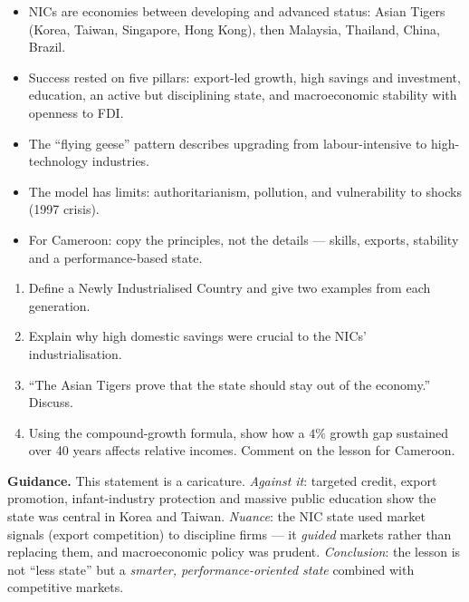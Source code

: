 \documentclass[11pt]{article}
\begin{document}
\begin{aretenir}
\begin{itemize}
\item NICs are economies between developing and advanced status: Asian Tigers (Korea, Taiwan, Singapore, Hong Kong), then Malaysia, Thailand, China, Brazil.
\item Success rested on five pillars: export-led growth, high savings and investment, education, an active but disciplining state, and macroeconomic stability with openness to FDI.
\item The ``flying geese'' pattern describes upgrading from labour-intensive to high-technology industries.
\item The model has limits: authoritarianism, pollution, and vulnerability to shocks (1997 crisis).
\item For Cameroon: copy the principles, not the details — skills, exports, stability and a performance-based state.
\end{itemize}
\end{aretenir}

\begin{exercice}[Practice]
\begin{enumerate}
\item Define a Newly Industrialised Country and give two examples from each generation.
\item Explain why high domestic savings were crucial to the NICs' industrialisation.
\item ``The Asian Tigers prove that the state should stay out of the economy.'' Discuss.
\item Using the compound-growth formula, show how a $4\%$ growth gap sustained over 40 years affects relative incomes. Comment on the lesson for Cameroon.
\end{enumerate}
\end{exercice}

\begin{corrige}[Exercise 3]
\textbf{Guidance.} This statement is a caricature. \emph{Against it}: targeted credit, export promotion, infant-industry protection and massive public education show the state was central in Korea and Taiwan. \emph{Nuance}: the NIC state used market signals (export competition) to discipline firms — it \emph{guided} markets rather than replacing them, and macroeconomic policy was prudent. \emph{Conclusion}: the lesson is not ``less state'' but a \emph{smarter, performance-oriented state} combined with competitive markets.
\end{corrige}
\end{document}
